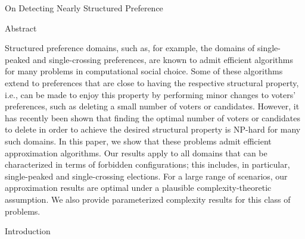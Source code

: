 \documentclass[11pt]{article}
\author{Rup}
\title{}
\begin{document}
{\raggedright
On Detecting Nearly Structured Preference
}

{\raggedright
Abstract
}

{\raggedright
Structured preference domains, such as, for example, the domains of
single-peaked and single-crossing preferences, are known to admit efficient
algorithms for many problems in computational social choice. Some of these
algorithms extend to preferences that are close to having the respective
structural property, i.e., can be made to enjoy this property by performing minor
changes to voters' preferences, such as deleting a small number of voters or
candidates. However, it has recently been shown that finding the optimal number
of voters or candidates to delete in order to achieve the desired structural
property is NP-hard for many such domains. In this paper, we show that these
problems admit efficient approximation algorithms. Our results apply to all
domains that can be characterized in terms of forbidden configurations; this
includes, in particular, single-peaked and single-crossing elections. For a large
range of scenarios, our approximation results are optimal under a plausible
complexity-theoretic assumption. We also provide parameterized complexity results
for this class of problems.
}

{\raggedright
Introduction
}
\end{document}
